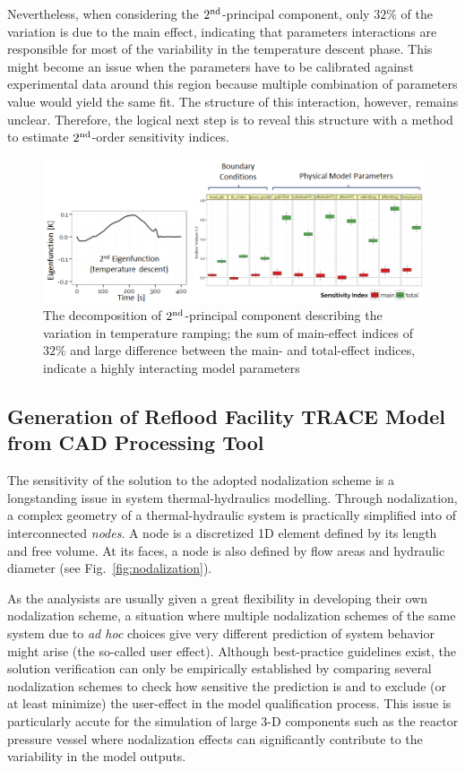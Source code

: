 \documentclass[11pt,titlepage]{article}
\begin{document}
Nevertheless, when considering the $2^\textnormal{nd}$-principal component, only $32\%$ of the variation is due to the main effect, indicating that parameters interactions are responsible for most of the 
variability in the temperature descent phase.
This might become an issue when the parameters have to be calibrated against experimental data around this region because multiple combination of parameters value would yield the same fit.
The structure of this interaction, however, remains unclear.
Therefore, the logical next step is to reveal this structure with a method to estimate $2^\textnormal{nd}$-order sensitivity indices.

\begin{figure}[h!]
	\centering
	\includegraphics[scale=0.65]{figures/2ndPrincipalComponent.png}
	\caption{The decomposition of $2^\textnormal{nd}$-principal component describing the variation in temperature ramping; the sum of main-effect indices of $32\%$ and large difference between the main- and total-effect indices, indicate a highly interacting model parameters}
	\label{fig:2ndpc}
\end{figure}

\subsection{Generation of Reflood Facility TRACE Model from CAD Processing Tool} 

The sensitivity of the solution to the adopted nodalization scheme is a longstanding issue in system thermal-hydraulics modelling.
Through nodalization, a complex geometry of a thermal-hydraulic system is practically simplified into  of interconnected \emph{nodes}. 
A node is a discretized 1D element defined by its length and free volume. 
At its faces, a node is also defined by flow areas and hydraulic diameter (see Fig.~\ref{fig:nodalization}).

As the analysists are usually given a great flexibility in developing their own nodalization scheme, a situation where multiple nodalization schemes of the same system due to \textit{ad hoc} choices give very different prediction of system behavior might arise (the so-called user effect).
Although best-practice guidelines exist, the solution verification can only be empirically established by comparing several nodalization schemes to check how sensitive the prediction is and to exclude (or at least minimize) the user-effect in the model qualification process.
This issue is particularly accute for the simulation of large 3-D components such as the reactor pressure vessel where nodalization effects can significantly contribute to the variability in the model outputs.
\end{document}
